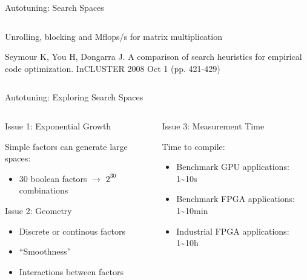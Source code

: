 \documentclass[10pt, compress, aspectratio=169, xcolor={table,usenames,dvipsnames}]{beamer}
\begin{document}
\begin{frame}[label={sec:orgdbfb7ba}]{Autotuning: Search Spaces}
\begin{columns}
\begin{column}{0.6\columnwidth}
\begin{center}
\alert{Unrolling}, \alert{blocking} and \alert{Mflops/s} for \alert{matrix multiplication}

\vspace{.1cm}

\scriptsize{Seymour K, You H, Dongarra J. A comparison of search heuristics for empirical code optimization. InCLUSTER 2008 Oct 1 (pp. 421-429)}
\end{center}
\end{column}
\end{columns}
\end{frame}

\begin{frame}[label={sec:org2f0cde9}]{Autotuning: Exploring Search Spaces}
\begin{columns}
\begin{column}{0.5\columnwidth}
\begin{block}{Issue 1: \alert{Exponential Growth}}
\vspace{.2cm}

\alert{Simple factors} can generate \alert{large spaces}:

\begin{itemize}
\item 30 \alert{boolean} factors \(\rightarrow\) \(2^{30}\) combinations
\end{itemize}

\begin{block}{Issue 2: \alert{Geometry}}
\begin{itemize}
\item \alert{Discrete} or \alert{continous} factors
\item \alert{``Smoothness''}
\item \alert{Interactions} between factors
\end{itemize}
\end{block}
\end{block}
\end{column}

\begin{column}{0.5\columnwidth}
\begin{block}{Issue 3: \alert{Measurement Time}}
\vspace{.2cm}

Time to \alert{compile}:

\begin{itemize}
\item \alert{Benchmark} GPU applications: \alert{1\textasciitilde{}10s}
\item \alert{Benchmark} FPGA applications: \alert{1\textasciitilde{}10min}
\item \alert{Industrial} FPGA applications: \alert{1\textasciitilde{}10h}
\end{itemize}
\end{block}
\end{column}
\end{columns}
\end{frame}
\end{document}
